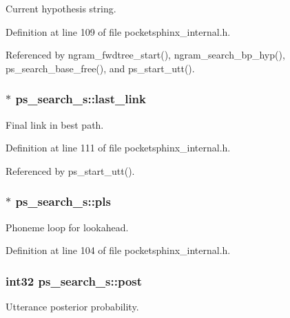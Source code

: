 Current hypothesis string. 



Definition at line 109 of file pocketsphinx\-\_\-internal.\-h.



Referenced by ngram\-\_\-fwdtree\-\_\-start(), ngram\-\_\-search\-\_\-bp\-\_\-hyp(), ps\-\_\-search\-\_\-base\-\_\-free(), and ps\-\_\-start\-\_\-utt().

\subsubsection[{last\-\_\-link}]{$\ast$ ps\-\_\-search\-\_\-s\-::last\-\_\-link}\label{structps__search__s_aa3020ef7bd4e56713dfe2fbad52e6e4f}


Final link in best path. 



Definition at line 111 of file pocketsphinx\-\_\-internal.\-h.



Referenced by ps\-\_\-start\-\_\-utt().

\subsubsection[{pls}]{$\ast$ ps\-\_\-search\-\_\-s\-::pls}\label{structps__search__s_a2a33b7698fb237b42e007788f65cd46c}


Phoneme loop for lookahead. 



Definition at line 104 of file pocketsphinx\-\_\-internal.\-h.

\subsubsection[{post}]{\setlength{\rightskip}{0pt plus 5cm}int32 ps\-\_\-search\-\_\-s\-::post}\label{structps__search__s_a721a656d0e34f7604ea8c52a1bdf14ff}


Utterance posterior probability. 



